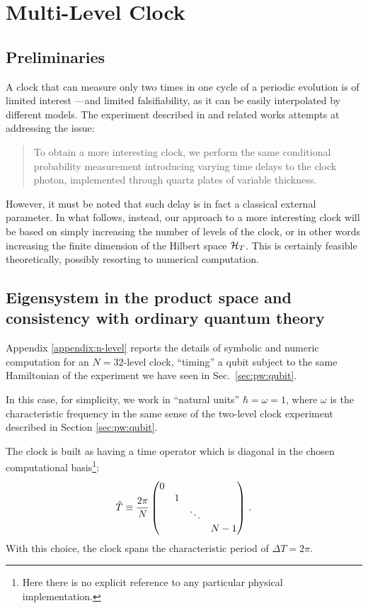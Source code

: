 \section{Multi-Level Clock}\label{sec:multiLevelClock}

\subsection{Preliminaries}

A clock that can measure only two times in one cycle of a periodic evolution
is of limited interest ---and limited falsifiability, as it can be easily
interpolated by different models.
The experiment described in
\cite{Moreva:synthetic} and related works attempts at addressing the issue:
\begin{quote}
  To obtain a more interesting clock, we perform the same conditional probability measurement
  introducing varying time delays to the clock photon, implemented through quartz plates of
  variable thickness.
\end{quote}
However, it must be noted that such delay is in fact a classical external parameter.
%
In what follows, instead, our approach to a more interesting clock will be based on simply
increasing the number of levels of the clock, or in other words increasing the
finite dimension of the Hilbert space $\mathcal{H}_T$. This is certainly feasible
theoretically, possibly resorting to numerical computation.


\subsection{Eigensystem in the product space and consistency with ordinary quantum \mbox{theory}}
\label{sec:building-the-discrete-pw-clock}
Appendix \ref{appendix:n-level} reports the details of
symbolic and
numeric computation for
an $N=32$-level clock, ``timing'' a qubit subject to the same Hamiltonian
of the experiment we have seen in Sec.~\ref{sec:pw:qubit}.

In this case, for simplicity, we work in
``natural units'' $\hbar = \omega = 1$, where $\omega$ is
the characteristic frequency in the same sense of the
two-level clock experiment described in Section \ref{sec:pw:qubit}.

The clock is built as having a time operator which is diagonal in the
chosen computational basis\footnote{
  Here there is no explicit reference to any particular physical implementation.
}:
\[
  \hat{T} \underset{}{\equiv} \frac{2\pi}{N}
  \begin{pmatrix}
    0           &       &       &       \\
                &1      &       &       \\
                &       &\ddots &       \\
                &       &       &N-1
  \end{pmatrix} \,\text{.}
\]
With this choice, the clock spans the characteristic period of $\Delta T = 2\pi$.

